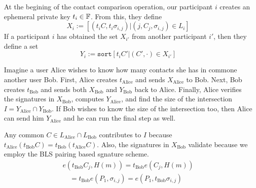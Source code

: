 \documentclass[twoside,letterpaper]{sig-alternate}
\def\mathperiod{.}
\def\mathperiod{}
\begin{document}
At the begining of the contact comparison operation,
our participant $i$ creates an ephemeral private key $t_i \in \mathbb{F}$.
From this, they define 
$$ X_i := %
  \left[ (t_i C, t_i \sigma_{i,j}) | (j,C_j,\sigma_{i,j}) \in L_i \right]
  \mathperiod $$ 
If a participant $i$ has obtained the set $X_{i'}$ from
 another participant $i'$, then they define a set 
$$ Y_i := \texttt{sort} \left[ t_i C' | (C',\cdot) \in X_{i'} \right]
  \mathperiod $$ 

Imagine a user Alice wishes to know how many contacts she has in commone
another user Bob.   
First, Alice creates $t_{\textrm{Alice}}$ and
 sends $X_{\textrm{Alice}}$ to Bob.
Next, Bob creates $t_{\textrm{Bob}}$ and
 sends both $X_{\textrm{Bob}}$ and $Y_{\textrm{Bob}}$ back to Alice.
Finally, Alice verifies the signatures in $X_{\textrm{Bob}}$,
 computes $Y_{\textrm{Alice}}$, and find the size of the intersection 
 $I = Y_{\textrm{Alice}} \cap Y_{\textrm{Bob}}$.
If Bob wishes to know the size of the intersection too, then Alice 
can send him $Y_{\textrm{Alice}}$ and he can run the final step as well.

Any common $C \in L_{\textrm{Alice}} \cap L_{\textrm{Bob}}$
 contributes to $I$ because
 $t_{\textrm{Alice}} (t_{\textrm{Bob}} C) = t_{\textrm{Bob}} (t_{\textrm{Alice}} C)$.
Also, the signatures in $X_{\textrm{Bob}}$ validate because 
we employ the BLS pairing based sgnature scheme. 
\begin{align*}
e( t_{\textrm{Bob}} C_j, H(m) )
 = t_{\textrm{Bob}} e( C_j, H(m) ) \\
 \quad = t_{\textrm{Bob}} e(P_1,\sigma_{i,j})
 = e(P_1,t_{\textrm{Bob}} \sigma_{i,j})
\end{align*}







\end{document}
